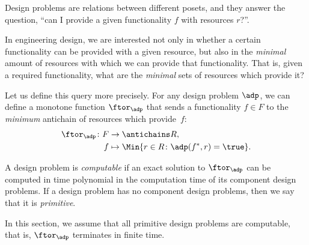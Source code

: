 
\label{sec:computation}

Design problems are relations between different posets, and they answer the question, ``can I provide a given functionality $f$ with resources $r$?''.

In engineering design, we are interested not only in whether a certain functionality can be provided with a given resource, but also in the \emph{minimal} amount of resources with which we can provide that functionality. That is, given a required functionality, what are the \emph{minimal} sets of resources which provide it?

Let us define this query more precisely.
For any design problem $\adp$, we can define a monotone function $\ftor_\adp$ that sends a functionality $f \in F$ to the \emph{minimum} antichain of resources which provide~$f$:
\begin{equation}
    \begin{aligned}
        \ftor_\adp \colon F &\to \antichains R, \\
        f &\mapsto \Min \{ r \in R \colon \adp(f^*, r) = \true \}.
    \end{aligned}
\end{equation}

\begin{definition}
    A design problem is \emph{computable} if an exact solution to $\ftor_\adp$ can be computed in time polynomial in the computation time of its component design problems. If a design problem has no component design problems, then we say that it is \emph{primitive}.
\end{definition}

In this section, we assume that all primitive design problems are computable, that is, $\ftor_\adp$ terminates in finite time.


